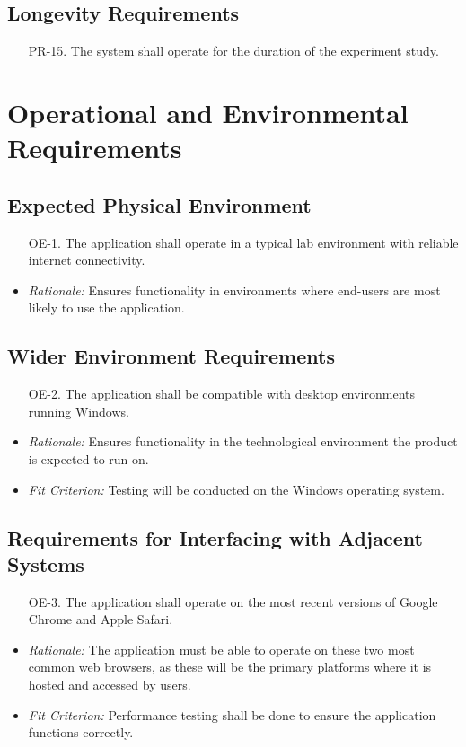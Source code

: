 \documentclass[12pt]{article}
\begin{document}
\subsection{Longevity Requirements}
\begin{enumerate}
  \item[PR-15.] The system shall operate for the duration of the experiment study.
\end{enumerate}

\section{Operational and Environmental Requirements}
\subsection{Expected Physical Environment}
\begin{enumerate}
  \item[OE-1.] The application shall operate in a typical lab environment with reliable internet connectivity.
\end{enumerate}
\begin{itemize}
  \item \textit{Rationale:} Ensures functionality in environments where end-users are most likely to use the application. 
\end{itemize}

\subsection{Wider Environment Requirements}
\begin{enumerate}
  \item[OE-2.] The application shall be compatible with desktop environments running Windows.
\end{enumerate}
\begin{itemize}
  \item \textit{Rationale:} Ensures functionality in the technological environment the product is expected to run on.
  \item \textit{Fit Criterion:} Testing will be conducted on the Windows operating system.
\end{itemize}

\subsection{Requirements for Interfacing with Adjacent Systems}
\begin{enumerate}
  \item[OE-3.] The application shall operate on the most recent versions of Google Chrome and Apple Safari.
\end{enumerate}
\begin{itemize}
  \item \textit{Rationale:} The application must be able to operate on these two most common web browsers, as these will be the primary platforms where it is hosted and accessed by users.
  \item \textit{Fit Criterion:} Performance testing shall be done to ensure the application functions correctly.
\end{itemize}
\end{document}
